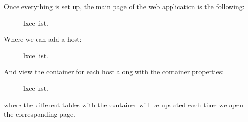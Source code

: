 Once everything is set up, the main page of the web application is the following:
\begin{figure}[H]
\label{fig:web-admin}
\centering
{}
\caption[Prototype setup]{\footnotesize{lxce list.}}
\end{figure}

Where we can add a host:
\begin{figure}[H]
\label{fig:lxce list}
\centering
{}
\caption[Prototype setup]{\footnotesize{lxce list.}}
\end{figure}

\newpage
And view the container for each host along with the container properties:
\begin{figure}[H]
\label{fig:lxce list}
\centering
{}
\caption[Prototype setup]{\footnotesize{lxce list.}}
\end{figure}

where the different tables with the container will be updated each time we open the corresponding page.

